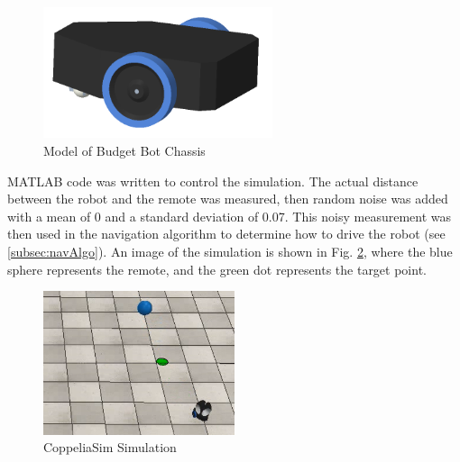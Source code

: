\begin{figure}
    \centering
    \includegraphics[width=0.6\textwidth]{figs/img/budgetBotModel.png}
    \caption{Model of Budget Bot Chassis}
    \label{fig:budgetBotModel}
\end{figure}

\vspace*{12pt}
\noindent
MATLAB code was written to control the simulation. The actual distance between the robot and the remote was measured, then random noise was added with a mean of 0 and a standard deviation of 0.07. This noisy measurement was then used in the navigation algorithm to determine how to drive the robot (see \autoref{subsec:navAlgo}). An image of the simulation is shown in Fig. \ref{fig:coppSimExample}, where the blue sphere represents the remote, and the green dot represents the target point.
\begin{figure}
    \centering
    \includegraphics[width=0.5\textwidth]{figs/img/coppSimExample.png}
    \caption{CoppeliaSim Simulation}
    \label{fig:coppSimExample}
\end{figure}


